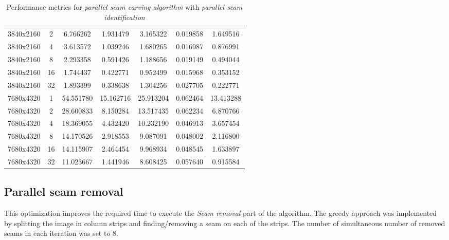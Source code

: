 \documentclass{article}
\begin{document}
\begin{table}[H]
\begin{tabular}{lcccccc}
        3840x2160 & 2 & 6.766262 & 1.931479 & 3.165322 & 0.019858 & 1.649516 \\
        3840x2160 & 4 & 3.613572 & 1.039246 & 1.680265 & 0.016987 & 0.876991 \\
        3840x2160 & 8 & 2.293358 & 0.591426 & 1.188656 & 0.019149 & 0.494044 \\
        3840x2160 & 16 & 1.744437 & 0.422771 & 0.952499 & 0.015968 & 0.353152 \\
        3840x2160 & 32 & 1.893399 & 0.338638 & 1.304256 & 0.027705 & 0.222771 \\
        \midrule
        7680x4320 & 1 & 54.551780 & 15.162716 & 25.913204 & 0.062464 & 13.413288 \\
        7680x4320 & 2 & 28.600833 & 8.150284 & 13.517435 & 0.062234 & 6.870766 \\
        7680x4320 & 4 & 18.369055 & 4.432420 & 10.232190 & 0.046913 & 3.657454 \\
        7680x4320 & 8 & 14.170526 & 2.918553 & 9.087091 & 0.048002 & 2.116800 \\
        7680x4320 & 16 & 14.115907 & 2.464454 & 9.968934 & 0.048545 & 1.633897 \\
        7680x4320 & 32 & 11.023667 & 1.441946 & 8.608425 & 0.057640 & 0.915584 \\
        \bottomrule
    \end{tabular}
    \caption{Performance metrics for \textit{parallel seam carving algorithm} with \textit{parallel seam identification}}
    \label{tab:performance}
\end{table}

\subsection{Parallel seam removal}
This optimization improves the required time to execute the \textit{Seam removal} part of the algorithm. The greedy approach was implemented by splitting the image in column strips and finding/removing a seam on each of the strips. The number of simultaneous number of removed seams in each iteration was set to 8.
\end{document}
